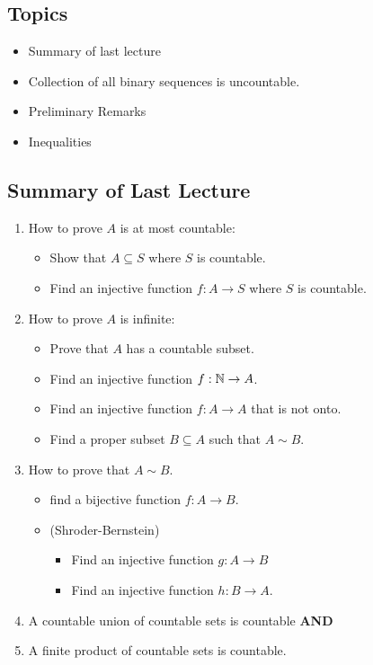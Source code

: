 \documentclass[a4paper]{report}
\begin{document}
\subsection{Topics}
\begin{itemize}
    \item Summary of last lecture
    \item Collection of all binary sequences is uncountable.
    \item Preliminary Remarks
    \item Inequalities
\end{itemize}

\subsection{Summary of Last Lecture}


\begin{enumerate}
    \item How to prove \( A  \) is at most countable:
        \begin{itemize}
            \item Show that \( A \subseteq S   \) where \( S  \) is countable.
            \item Find an injective function \( f: A \to S  \) where \( S  \) is countable.  
        \end{itemize}
    \item How to prove \( A  \) is infinite:
        \begin{itemize}
            \item Prove that \( A  \) has a countable subset.
            \item Find an injective function \( f: \mathbb{N} \to A  \).
            \item Find an injective function \( f: A \to A  \) that is not onto.
            \item Find a proper subset \( B \subseteq  A  \) such that \( A \sim B  \).
        \end{itemize}
    \item How to prove that \( A \sim B  \).
        \begin{itemize}
            \item find a bijective function \( f: A \to B  \).
            \item (Shroder-Bernstein) 
                \begin{itemize}
                    \item Find an injective function \( g: A \to B  \)
                    \item Find an injective function \( h: B \to A  \).
                \end{itemize}
        \end{itemize}
\item A countable union of countable sets is countable \textbf{AND}
\item A finite product of countable sets is countable. 
\end{enumerate}
\end{document}
